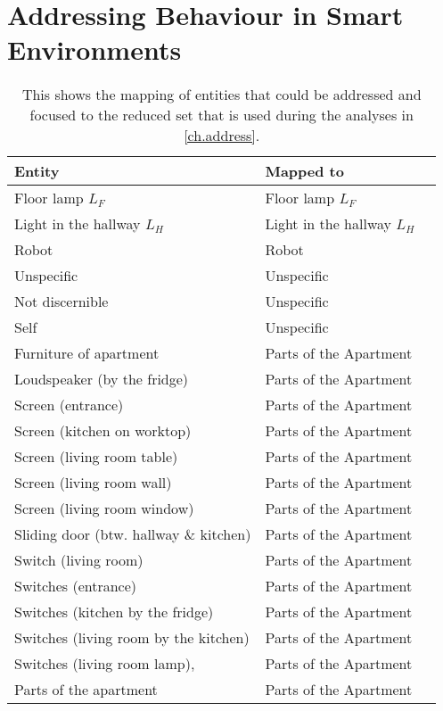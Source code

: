 \chapter{Addressing Behaviour in Smart Environments}

\begin{table}[!ht]
  \centering
    \begin{tabulary}{\textwidth}{L L L}
      \toprule
        Entity                                     & Mapped to \\ \midrule
        Floor lamp \(L_F\)                         & Floor lamp \(L_F\) \\
        Light in the hallway \(L_H\)               & Light in the hallway \(L_H\)     \\
        Robot                                      & Robot      \\
        Unspecific                                 & Unspecific      \\
        Not discernible                            & Unspecific      \\
        Self                                       & Unspecific      \\
        Furniture of apartment                     & Parts of the Apartment  \\
        Loudspeaker (by the fridge)                & Parts of the Apartment  \\
        Screen (entrance)                          & Parts of the Apartment  \\
        Screen (kitchen on worktop)                & Parts of the Apartment  \\
        Screen (living room table)                 & Parts of the Apartment  \\
        Screen (living room wall)                  & Parts of the Apartment  \\
        Screen (living room window)                & Parts of the Apartment  \\
        Sliding door (btw. hallway \& kitchen)     & Parts of the Apartment  \\
        Switch (living room)                       & Parts of the Apartment  \\
        Switches (entrance)                        & Parts of the Apartment  \\
        Switches (kitchen by the fridge)           & Parts of the Apartment  \\
        Switches (living room by the kitchen)      & Parts of the Apartment  \\
        Switches (living room lamp),               & Parts of the Apartment  \\
        Parts of the apartment                     & Parts of the Apartment  \\
        \bottomrule
    \end{tabulary}
    \caption[Addressable entity mapping.]{\label{app:study-addressee-addressees-codes}
    This shows the mapping of entities that could be addressed and focused to the reduced set that is used during the analyses in \vref{ch.address}.
    }
\end{table}

